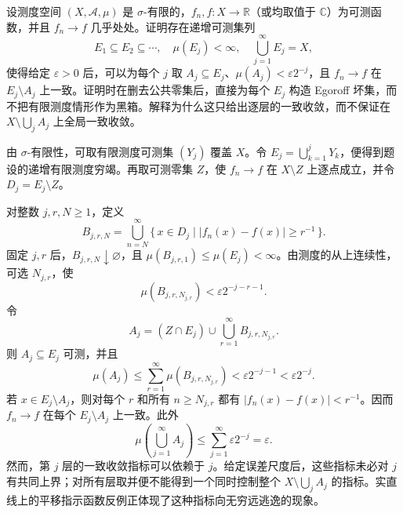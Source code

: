 \begin{exercise}\label{b1:ex:0409}
设测度空间 \((X,\mathcal A,\mu)\) 是 \(\sigma\)-有限的，\(f_n,f:X\rightarrow\mathbb R\)（或均取值于 \(\mathbb C\)）为可测函数，并且
\(f_n\to f\) 几乎处处。证明存在递增可测集列
\[
E_1\subseteq E_2\subseteq\cdots,
\quad
\mu(E_j)<\infty,
\quad
\bigcup_{j=1}^{\infty}E_j=X,
\]
使得给定 \(\varepsilon>0\) 后，可以为每个 \(j\) 取
\(A_j\subseteq E_j\)、\(\mu(A_j)<\varepsilon2^{-j}\)，且
\(f_n\to f\) 在 \(E_j\setminus A_j\) 上一致。证明时在删去公共零集后，直接为每个 \(E_j\) 构造 Egoroff 坏集，而不把有限测度情形作为黑箱。解释为什么这只给出逐层的一致收敛，而不保证在
\(X\setminus\bigcup_jA_j\) 上全局一致收敛。
\end{exercise}
\begin{solution}
由 \(\sigma\)-有限性，可取有限测度可测集 \((Y_j)\) 覆盖
\(X\)。令 \(E_j=\bigcup_{k=1}^{j}Y_k\)，便得到题设的递增有限测度穷竭。再取可测零集 \(Z\)，使 \(f_n\to f\) 在 \(X\setminus Z\) 上逐点成立，并令 \(D_j=E_j\setminus Z\)。

对整数 \(j,r,N\geq1\)，定义
\[
B_{j,r,N}
=\bigcup_{n=N}^{\infty}
  \{\,x\in D_j\mid |f_n(x)-f(x)|\geq r^{-1}\,\}.
\]
固定 \(j,r\) 后，\(B_{j,r,N}\downarrow\varnothing\)，且
\(\mu(B_{j,r,1})\leq\mu(E_j)<\infty\)。由测度的从上连续性，可选 \(N_{j,r}\)，使
\[
\mu(B_{j,r,N_{j,r}})
<\varepsilon2^{-j-r-1}.
\]
令
\[
A_j=(Z\cap E_j)
\cup\bigcup_{r=1}^{\infty}B_{j,r,N_{j,r}}.
\]
则 \(A_j\subseteq E_j\) 可测，并且
\[
\mu(A_j)
\leq\sum_{r=1}^{\infty}\mu(B_{j,r,N_{j,r}})
<\varepsilon2^{-j-1}<\varepsilon2^{-j}.
\]
若 \(x\in E_j\setminus A_j\)，则对每个 \(r\) 和所有 \(n\geq N_{j,r}\) 都有
\(|f_n(x)-f(x)|<r^{-1}\)。因而 \(f_n\to f\) 在每个
\(E_j\setminus A_j\) 上一致。此外
\[
\mu\left(\bigcup_{j=1}^{\infty}A_j\right)
\leq\sum_{j=1}^{\infty}\varepsilon2^{-j}
=\varepsilon.
\]
然而，第 \(j\) 层的一致收敛指标可以依赖于 \(j\)。给定误差尺度后，这些指标未必对 \(j\) 有共同上界；对所有层取并便不能得到一个同时控制整个
\(X\setminus\bigcup_jA_j\) 的指标。实直线上的平移指示函数反例正体现了这种指标向无穷远逃逸的现象。
\end{solution}
